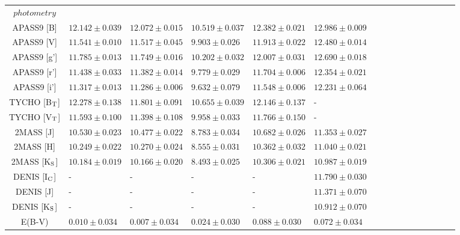 \begin{table*}
\begin{tabular}{c l l  l l l l l l l l l l l l l }
$photometry$ \\
APASS9 [B]  & 
$12.142 \pm 0.039$ &
$12.072 \pm 0.015$ &
$10.519 \pm 0.037$ &
$12.382 \pm 0.021$ &
$12.986 \pm 0.009$ \\

APASS9 [V]  & 
$11.541 \pm 0.010$ &
$11.517 \pm 0.045$ &
$9.903 \pm 0.026$ &
$11.913 \pm 0.022$ &
$12.480 \pm 0.014$ \\

APASS9 [g'] & 
$11.785 \pm 0.013$ &
$11.749 \pm 0.016$ &
$10.202 \pm 0.032$ &
$12.007 \pm 0.031$ &
$12.690 \pm 0.018$ \\

APASS9 [r'] & 
$11.438 \pm 0.033$ &
$11.382 \pm 0.014$ &
$9.779 \pm 0.029$ &
$11.704 \pm 0.006$ &
$12.354 \pm 0.021$ \\

APASS9 [i'] &
$11.317 \pm 0.013$ &
$11.286 \pm 0.006$ &
$9.632 \pm 0.079$ &
$11.548 \pm 0.006$ &
$12.231 \pm 0.064$ \\


TYCHO [B$_{\rm T}$] & 
$12.278 \pm 0.138$ &
$11.801 \pm 0.091$ &
$10.655 \pm 0.039$ &
$12.146 \pm 0.137$ &
- \\

TYCHO [V$_{\rm T}$] & 
$11.593 \pm 0.100$ &
$11.398 \pm 0.108$ &
$9.958 \pm 0.033$ &
$11.766 \pm 0.150$ &
- \\
2MASS [J] & 
$10.530 \pm 0.023$ &
$10.477 \pm 0.022$ &
$8.783 \pm 0.034$ &
$10.682 \pm 0.026$ &
$11.353 \pm 0.027$ \\

2MASS [H] & 
$10.249 \pm 0.022$ &
$10.270 \pm 0.024$ &
$8.555 \pm 0.031$ &
$10.362 \pm 0.032$ &
$11.040 \pm 0.021$ \\

2MASS [K$_{\rm S}$] & 
$10.184 \pm 0.019$ &
$10.166 \pm 0.020$ &
$8.493 \pm 0.025$ &
$10.306 \pm 0.021$ &
$10.987 \pm 0.019$ \\

DENIS [I$_{\rm C}$] & -  & - & - & - & $11.790 \pm 0.030$ \\
DENIS [J] & -  & - & - & - & $11.371 \pm 0.070$ \\
DENIS [K$_{\rm S}$] & -  & - & - & - & $10.912 \pm 0.070$ \\

E(B-V) & 
$0.010 \pm 0.034$ &
$0.007 \pm 0.034$ &
$0.024 \pm 0.030$ &
$0.088 \pm 0.030$ &
$0.072 \pm 0.034$ \\


\end{tabular}
\end{table*}








